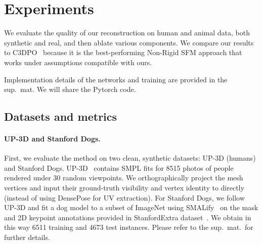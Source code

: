 \section{Experiments}\label{s:experiments}



We evaluate the quality of our reconstruction on human and animal data, both synthetic and real, and then ablate various components.
We compare our results to C3DPO~\cite{novotny19c3dpo} because it is the best-performing Non-Rigid SFM approach that works under assumptions compatible with ours.

Implementation details of the networks and training are provided in the sup.~mat.
We will share the Pytorch code.

\subsection{Datasets and metrics}

\paragraph{UP-3D and Stanford Dogs.}

First, we evaluate the method on two clean, synthetic datasets: UP-3D (humans) and Stanford Dogs.
UP-3D~\cite{Lassner2017} contains SMPL fits for 8515 photos of people rendered under 30 random viewpoints.
We orthographically project the mesh vertices and input their ground-truth visibility and vertex identity to \method directly (instead of using DensePose for UV extraction).
For Stanford Dogs, we follow UP-3D and fit a dog model to a subset of ImageNet using SMALify~\cite{biggs18creatures} on the mask and 2D keypoint annotations provided in StanfordExtra dataset~\cite{biggs2020wldo}.
We obtain in this way 6511 training and 4673 test instances.
Please refer to the sup.~mat.~for further details.

